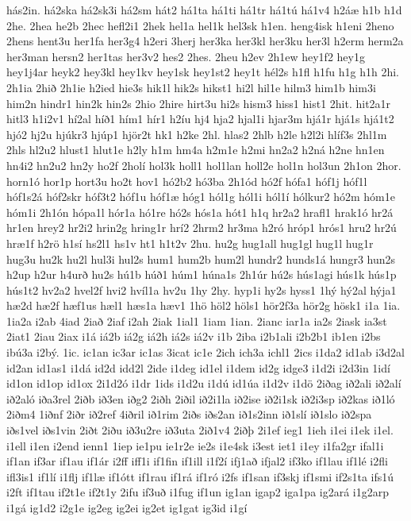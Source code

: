 {hás2in.
há2ska
há2sk3i
há2sm
hát2
há1ta
há1ti
há1tr
há1tú
há1v4
h2áæ
h1b
h1d
2he.
2hea
he2b
2hec
hefl2i1
2hek
hel1a
hel1k
hel3sk
h1en.
heng4isk
h1eni
2heno
2hens
hent3u
her1fa
her3g4
h2eri
3herj
her3ka
her3kl
her3ku
her3l
h2erm
herm2a
her3man
hersn2
her1tas
her3v2
hes2
2hes.
2heu
h2ev
2h1ew
hey1f2
hey1g
hey1j4ar
heyk2
hey3kl
hey1kv
hey1sk
hey1st2
hey1t
hél2s
h1fl
h1fu
h1g
h1h
2hi.
2h1ia
2hið
2h1ie
h2ied
hie3s
hik1l
hik2s
hikst1
hi2l
hil1e
hilm3
him1b
him3i
him2n
hindr1
hin2k
hin2s
2hio
2hire
hirt3u
hi2s
hism3
hiss1
hist1
2hit.
hit2a1r
hitl3
h1i2v1
hí2al
híð1
hím1
hír1
h2íu
hj4
hja2
hjal1i
hjar3m
hjá1r
hjá1s
hjá1t2
hjó2
hj2u
hjúkr3
hjúp1
hjör2t
hk1
h2ke
2hl.
hlas2
2hlb
h2le
h2l2i
hlíf3s
2hl1m
2hls
hl2u2
hlust1
hlut1e
h2ly
h1m
hm4a
h2m1e
h2mi
hn2a2
h2ná
h2ne
hn1en
hn4i2
hn2u2
hn2y
ho2f
2holí
hol3k
holl1
hol1lan
holl2e
hol1n
hol3un
2h1on
2hor.
horn1ó
hor1p
hort3u
ho2t
hov1
hó2b2
hó3ba
2h1ód
hó2f
hófa1
hóf1j
hóf1l
hóf1s2á
hóf2skr
hóf3t2
hóf1u
hóf1æ
hóg1
hól1g
hól1i
hól1í
hólkur2
hó2m
hóm1e
hóm1i
2h1ón
hópa1l
hór1a
hó1re
hó2s
hós1a
hót1
h1q
hr2a2
hrafl1
hrak1ó
hr2á
hr1en
hrey2
hr2i2
hrin2g
hring1r
hrí2
2hrm2
hr3ma
h2ró
hróp1
hrós1
hru2
hr2ú
hræ1f
h2rö
h1sí
hs2l1
hs1v
ht1
h1t2v
2hu.
hu2g
hug1all
hug1gl
hug1l
hug1r
hug3u
hu2k
hu2l
hul3i
hul2s
hum1
hum2b
hum2l
hundr2
hunds1á
hungr3
hun2s
h2up
h2ur
h4urð
hu2s
hú1b
húð1
húm1
húna1s
2h1úr
hú2s
hús1agi
hús1k
hús1p
hús1t2
hv2a2
hvel2f
hvi2
hvíl1a
hv2u
1hy
2hy.
hyp1i
hy2s
hyss1
1hý
hý2al
hýja1
hæ2d
hæ2f
hæf1us
hæl1
hæs1a
hæv1
1hö
höl2
höls1
hör2f3a
hör2g
hösk1
i1a
1ia.
1ia2a
i2ab
4iad
2iað
2iaf
i2ah
2iak
1ial1
1iam
1ian.
2ianc
iar1a
ia2s
2iask
ia3st
2iat1
2iau
2iax
i1á
iá2b
iá2g
iá2h
iá2s
iá2v
i1b
2iba
i2b1ali
i2b2b1
ib1en
i2bs
ibú3a
i2bý.
1ic.
ic1an
ic3ar
ic1as
3icat
ic1e
2ich
ich3a
ichl1
2ics
i1da2
id1ab
i3d2al
id2an
id1as1
i1dá
id2d
idd2l
2ide
i1deg
id1el
i1dem
id2g
idge3
i1d2i
i2d3in
1idí
id1on
id1op
id1ox
2i1d2ó
i1dr
1ids
i1d2u
i1dú
id1úa
i1d2v
i1dö
2iðag
ið2ali
ið2alí
ið2aló
iða3rel
2iðb
ið3en
iðg2
2iðh
2iðil
ið2i1la
ið2ise
ið2i1sk
ið2i3sp
ið2kas
ið1ló
2iðm4
1iðnf
2iðr
ið2ref
4iðril
ið1rim
2iðs
iðs2an
ið1s2inn
ið1slí
ið1slo
ið2spa
iðs1vel
iðs1vin
2iðt
2iðu
ið3u2re
ið3uta
2ið1v4
2iðþ
2i1ef
ieg1
1ieh
i1ei
i1ek
i1el.
i1ell
i1en
i2end
ienn1
1iep
ie1pu
ie1r2e
ie2s
i1e4sk
i3est
iet1
i1ey
i1fa2gr
ifal1i
if1an
if3ar
if1au
if1ár
i2ff
iff1i
if1fin
if1ill
i1f2í
ifj1að
ifjal2
if3ko
if1lau
if1lé
i2fli
ifl3is1
if1lí
i1flj
if1læ
if1ótt
if1rau
if1rá
if1ró
i2fs
if1san
if3skj
if1smi
if2s1ta
ifs1ú
i2ft
if1tau
if2t1e
if2t1y
2ifu
if3uð
i1fug
if1un
ig1an
igap2
iga1pa
ig2ará
i1g2arp
i1gá
ig1d2
i2g1e
ig2eg
ig2ei
ig2et
ig1gat
ig3id
i1gí
}
